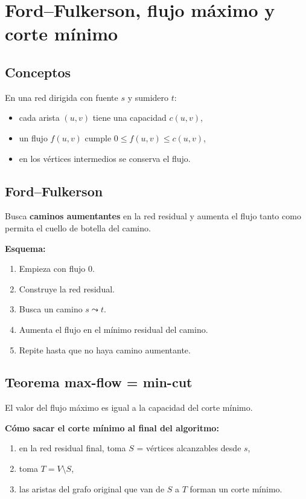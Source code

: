 \documentclass[11pt,a4paper]{article}
\begin{document}
\section{Ford--Fulkerson, flujo máximo y corte mínimo}

\subsection{Conceptos}
En una red dirigida con fuente $s$ y sumidero $t$:
\begin{itemize}
    \item cada arista $(u,v)$ tiene una capacidad $c(u,v)$,
    \item un flujo $f(u,v)$ cumple $0\le f(u,v)\le c(u,v)$,
    \item en los vértices intermedios se conserva el flujo.
\end{itemize}

\subsection{Ford--Fulkerson}
Busca \textbf{caminos aumentantes} en la red residual y aumenta el flujo tanto como permita el cuello de botella del camino.

\textbf{Esquema:}
\begin{enumerate}
    \item Empieza con flujo $0$.
    \item Construye la red residual.
    \item Busca un camino $s\leadsto t$.
    \item Aumenta el flujo en el mínimo residual del camino.
    \item Repite hasta que no haya camino aumentante.
\end{enumerate}

\subsection{Teorema max-flow = min-cut}
El valor del flujo máximo es igual a la capacidad del corte mínimo.

\textbf{Cómo sacar el corte mínimo al final del algoritmo:}
\begin{enumerate}
    \item en la red residual final, toma $S$ = vértices alcanzables desde $s$,
    \item toma $T=V\setminus S$,
    \item las aristas del grafo original que van de $S$ a $T$ forman un corte mínimo.
\end{enumerate}
\end{document}
